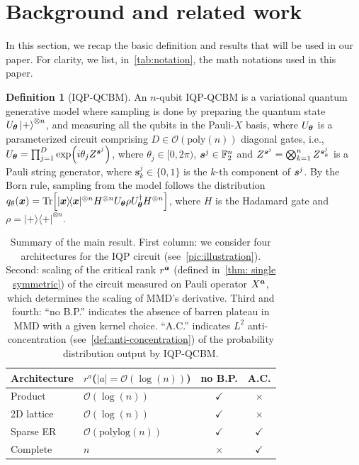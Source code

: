 \documentclass{article}
\theoremstyle{plain}
\theoremstyle{definition}
\newtheorem{definition}[theorem]{Definition}
\theoremstyle{remark}
\begin{document}
\section{Background and related work} \label{sec:background}
In this section, we recap the basic definition and results that will be used in our paper. For clarity, we list, in~\cref{tab:notation}, the math notations used in this paper. 
\begin{definition}[IQP-QCBM]
\label{def: IQP}
An $n$-qubit IQP-QCBM is a variational quantum generative model where sampling is done by preparing the quantum state $U_{\bm{\theta}} \ket{+}^{\otimes n}$, and measuring all the qubits in the Pauli-$X$ basis, where $U_{\bm{\theta}}$ is a parameterized circuit comprising $D \in \mathcal{O}(\mathrm{poly}(n))$ diagonal gates, i.e., $
U_{\bm{\theta}} = \prod_{j=1}^D \exp({i\theta_j Z^{{\bm{s}^j}}})$, where $\theta_j\in[0, 2\pi)$, ${\bm{s}^j} \in \mathbb{F}_2^n$ and $Z^{{\bm{s}^j}} = \bigotimes_{k=1}^n Z^{\bm{s}^j_k}$ is a Pauli string generator, where $\bm{s}^j_k\in\{0,1\}$ is the $k$-th component of ${\bm{s}^j}$. By the Born rule, sampling from the model follows the distribution $q_{\theta}({\bm{x}}) = \Tr[|{\bm{x}} \rangle\!\langle {\bm{x}}|^{\otimes n}H^{\otimes n} U_{\bm{\theta}} \rho U_{\bm{\theta}}^\dagger H^{\otimes n}]$, where $H$ is the Hadamard gate and $\rho = |+\rangle\!\langle+|^{\otimes n}$.
\end{definition}
\begin{table}[t]
\centering
\caption{Summary of the main result. First column: we consider four architectures for the IQP circuit (see~\cref{pic:illustration}). Second: scaling of the critical rank $r^{\bm{a}}$ (defined in~\cref{thm: single symmetric}) of the circuit measured on Pauli operator $X^{{\bm{a}}}$, which determines the scaling of MMD's derivative. Third and fourth: ``no B.P.'' indicates the absence of barren plateau in MMD with a given kernel choice. ``A.C.'' indicates $L^2$ anti-concentration (see~\cref{def:anti-concentration}) of the probability distribution output by IQP-QCBM.}
\label{tab:examples-summary}
\begin{tabular}{llcc}
\toprule
Architecture 
& $r^a$($|a|=\mathcal{O}(\log(n))$) 
& no B.P. 
& A.C. \\
\hline
Product
& $\mathcal{O}(\log(n))$
& $\checkmark$
& $\times$ \\

2D lattice
& $\mathcal{O}(\log(n))$
& $\checkmark$
& $\times$ \\

Sparse ER
& $\mathcal{O}(\mathrm{polylog}(n))$
& $\checkmark$
& $\checkmark$ \\

Complete
& $n$
& $\times$
& $\checkmark$ \\
\bottomrule
\end{tabular}
\end{table}
\end{document}
